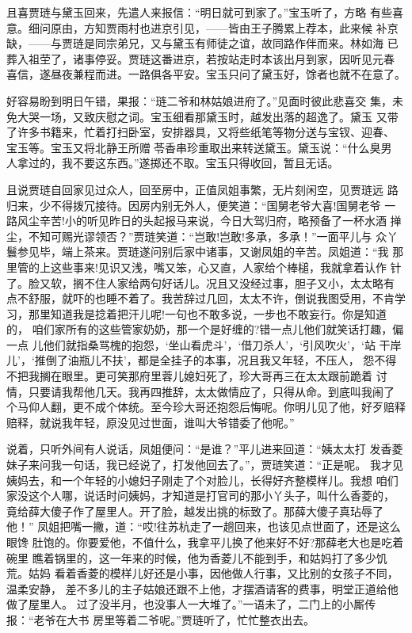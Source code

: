 且喜贾琏与黛玉回来，先遣人来报信：“明日就可到家了。”宝玉听了，方略
有些喜意。细问原由，方知贾雨村也进京引见，——皆由王子腾累上荐本，此来候
补京缺，——与贾琏是同宗弟兄，又与黛玉有师徒之谊，故同路作伴而来。林如海
已葬入祖茔了，诸事停妥。贾琏这番进京，若按站走时本该出月到家，因听见元春
喜信，遂昼夜兼程而进。一路俱各平安。宝玉只问了黛玉好，馀者也就不在意了。

好容易盼到明日午错，果报：“琏二爷和林姑娘进府了。”见面时彼此悲喜交
集，未免大哭一场，又致庆慰之词。宝玉细看那黛玉时，越发出落的超逸了。黛玉
又带了许多书籍来，忙着打扫卧室，安排器具，又将些纸笔等物分送与宝钗、迎春、
宝玉等。宝玉又将北静王所赠苓香串珍重取出来转送黛玉。黛玉说：“什么臭男
人拿过的，我不要这东西。”遂掷还不取。宝玉只得收回，暂且无话。

且说贾琏自回家见过众人，回至房中，正值凤姐事繁，无片刻闲空，见贾琏远
路归来，少不得拨冗接待。因房内别无外人，便笑道：“国舅老爷大喜!国舅老爷
一路风尘辛苦!小的听见昨日的头起报马来说，今日大驾归府，略预备了一杯水酒
掸尘，不知可赐光谬领否？”贾琏笑道：“岂敢!岂敢!多承，多承！”一面平儿与
众丫鬟参见毕，端上茶来。贾琏遂问别后家中诸事，又谢凤姐的辛苦。凤姐道：“我
那里管的上这些事来!见识又浅，嘴又笨，心又直，人家给个棒槌，我就拿着认作
针了。脸又软，搁不住人家给两句好话儿。况且又没经过事，胆子又小，太太略有
点不舒服，就吓的也睡不着了。我苦辞过几回，太太不许，倒说我图受用，不肯学
习，那里知道我是捻着把汗儿呢!一句也不敢多说，一步也不敢妄行。你是知道的，
咱们家所有的这些管家奶奶，那一个是好缠的?错一点儿他们就笑话打趣，偏一点
儿他们就指桑骂槐的抱怨，‘坐山看虎斗’，‘借刀杀人’，‘引风吹火’，‘站
干岸儿’，‘推倒了油瓶儿不扶’，都是全挂子的本事，况且我又年轻，不压人，
怨不得不把我搁在眼里。更可笑那府里蓉儿媳妇死了，珍大哥再三在太太跟前跪着
讨情，只要请我帮他几天。我再四推辞，太太做情应了，只得从命。到底叫我闹了
个马仰人翻，更不成个体统。至今珍大哥还抱怨后悔呢。你明儿见了他，好歹赔释
赔释，就说我年轻，原没见过世面，谁叫大爷错委了他呢。”

说着，只听外间有人说话，凤姐便问：“是谁？”平儿进来回道：“姨太太打
发香菱妹子来问我一句话，我已经说了，打发他回去了。”，贾琏笑道：“正是呢。
我才见姨妈去，和一个年轻的小媳妇子刚走了个对脸儿，长得好齐整模样儿。我想
咱们家没这个人哪，说话时问姨妈，才知道是打官司的那小丫头子，叫什么香菱的，
竟给薛大傻子作了屋里人。开了脸，越发出挑的标致了。那薛大傻子真玷辱了他！”
凤姐把嘴一撇，道：“哎!往苏杭走了一趟回来，也该见点世面了，还是这么眼馋
肚饱的。你要爱他，不值什么，我拿平儿换了他来好不好?那薛老大也是吃着碗里
瞧着锅里的，这一年来的时候，他为香菱儿不能到手，和姑妈打了多少饥荒。姑妈
看着香菱的模样儿好还是小事，因他做人行事，又比别的女孩子不同，温柔安静，
差不多儿的主子姑娘还跟不上他，才摆酒请客的费事，明堂正道给他做了屋里人。
过了没半月，也没事人一大堆了。”一语未了，二门上的小厮传报：“老爷在大书
房里等着二爷呢。”贾琏听了，忙忙整衣出去。

